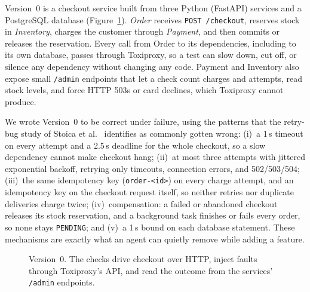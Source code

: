 Version~0 is a checkout service built from three Python (FastAPI) services and a PostgreSQL
database (Figure~\ref{fig:arch}). \emph{Order} receives \texttt{POST /checkout}, reserves stock in
\emph{Inventory}, charges the customer through \emph{Payment}, and then commits or releases the
reservation. Every call from Order to its dependencies, including to its own database, passes
through Toxiproxy, so a test can slow down, cut off, or silence any dependency without changing
any code. Payment and Inventory also expose small \texttt{/admin} endpoints that let a check count
charges and attempts, read stock levels, and force HTTP 503s or card declines, which Toxiproxy
cannot produce.

We wrote Version~0 to be correct under failure, using the patterns that the retry-bug study of
Stoica et al.~\cite{stoica2024retry} identifies as commonly gotten wrong:
(i)~a 1\,s timeout on every attempt and a 2.5\,s deadline for the whole checkout, so a slow
dependency cannot make checkout hang;
(ii)~at most three attempts with jittered exponential backoff, retrying only timeouts, connection
errors, and 502/503/504;
(iii)~the same idempotency key (\texttt{order-<id>}) on every charge attempt, and an idempotency key
on the checkout request itself, so neither retries nor duplicate deliveries charge twice;
(iv)~compensation: a failed or abandoned checkout releases its stock reservation, and a background
task finishes or fails every order, so none stays \texttt{PENDING}; and
(v)~a 1\,s bound on each database statement.
These mechanisms are exactly what an agent can quietly remove while adding a feature.

\begin{figure}[t]
  \centering
  \caption{Version~0. The checks drive checkout over HTTP, inject faults through Toxiproxy's API,
  and read the outcome from the services' \texttt{/admin} endpoints.}
  \label{fig:arch}
\end{figure}

